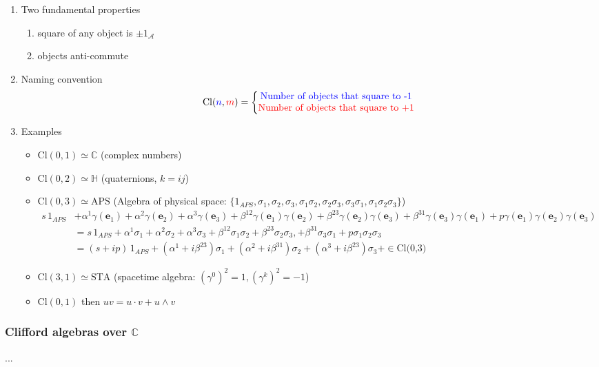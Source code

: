 \documentclass[../main.tex]{subfiles}
\begin{document}
\begin{itemize}
\begin{enumerate}
\item Two fundamental properties
\begin{enumerate}
\item square of any object is $\pm1_\mathcal{A}$
\item objects anti-commute 
\end{enumerate}
\item Naming convention
\begin{align}
\text{Cl}(\textcolor{blue}{n},\textcolor{red}{m}) = \left\{\begin{matrix}
\text{\textcolor{blue}{Number of objects that square to -1}}\\
\text{\textcolor{red}{Number of objects that square to +1}}
\end{matrix}\right.
\end{align}
\item Examples
\begin{itemize}
\item $\text{Cl}(0,1)\simeq\mathbb{C}$ (complex numbers)
\item $\text{Cl}(0,2)\simeq\mathbb{H}$ (quaternions, $k=ij$)
\item $\text{Cl}(0,3)\simeq\text{APS}$ (Algebra of physical space: $\{1_{APS},\sigma_1,\sigma_2,\sigma_3,\sigma_1\sigma_2,\sigma_2\sigma_3,\sigma_3\sigma_1,\sigma_1\sigma_2\sigma_3\}$)
\begin{align}
s\,1_{APS}&+\alpha^1\gamma(\mathbf{e}_1)+\alpha^2\gamma(\mathbf{e}_2)+\alpha^3\gamma(\mathbf{e}_3)+\beta^{12}\gamma(\mathbf{e}_1)\gamma(\mathbf{e}_2)+\beta^{23}\gamma(\mathbf{e}_2)\gamma(\mathbf{e}_3)+\beta^{31}\gamma(\mathbf{e}_3)\gamma(\mathbf{e}_1)+p\gamma(\mathbf{e}_1)\gamma(\mathbf{e}_2)\gamma(\mathbf{e}_3)\\
&=s\,1_{APS}+\alpha^1\sigma_1+\alpha^2\sigma_2+\alpha^3\sigma_3+\beta^{12}\sigma_1\sigma_2+\beta^{23}\sigma_2\sigma_3,+\beta^{31}\sigma_3\sigma_1+p\sigma_1\sigma_2\sigma_3\\
&=(s+ip)\,1_{APS}+(\alpha^1+i\beta^{23})\sigma_1+(\alpha^2+i\beta^{31})\sigma_2+(\alpha^3+i\beta^{23})\sigma_3+\in\text{Cl(0,3)}
\end{align}
\item $\text{Cl}(3,1)\simeq\text{STA}$ (spacetime algebra: $(\gamma^0)^2=1,(\gamma^k)^2=-1$)
\item $\text{Cl}(0,1)$ then $uv = u\cdot v+u\wedge v$
\end{itemize}
\end{enumerate}

\subsubsection{Clifford algebras over $\mathbb{C}$}
...

\end{itemize}
\end{document}
